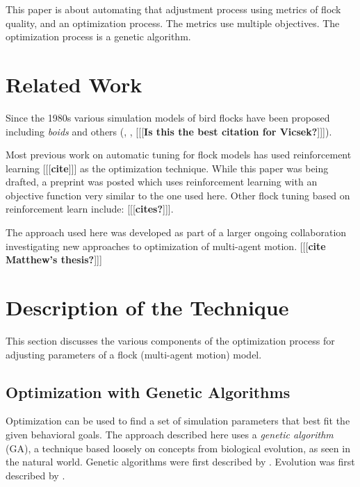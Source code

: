 \documentclass[letterpaper]{article}
\begin{document}
This paper is about automating that adjustment process using metrics of flock quality, and an optimization process. The metrics use multiple objectives. The optimization process is a genetic algorithm.

\section{Related Work}
\label{sec:related}

Since the 1980s various simulation models of bird flocks have been proposed including \textit{boids} \citep{reynolds_flocks_1987} and others (\citet{aoki_simulation_1982}, \citet{cucker_emergent_2007}, \citet{bhattacharya_collective_2010} [[[\textbf{Is this the best citation for Vicsek?}]]]).
\par

Most previous work on automatic tuning for flock models has used reinforcement learning [[[\textbf{cite}]]] as the optimization technique. While this paper was being drafted, a preprint was posted \citep{brambati_learning_2025} which uses reinforcement learning with an objective function very similar to the one used here. Other flock tuning based on reinforcement learn include:
[[[\textbf{cites?}]]].
\par


The approach used here was developed as part of a larger ongoing collaboration investigating new approaches to optimization of multi-agent motion. [[[\textbf{cite Matthew's thesis?}]]]

\section{Description of the Technique}
\label{sec:Description}

This section discusses the various components of the optimization process for adjusting parameters of a flock (multi-agent motion) model.
\par

\subsection{Optimization with Genetic Algorithms}
\label{subsec:Optimization_with_GA}

Optimization can be used to find a set of simulation parameters that best fit the given behavioral goals. The approach described here uses a \textit{genetic algorithm} (GA), a technique based loosely on concepts from biological evolution, as seen in the natural world. Genetic algorithms were first described by \citet{holland_adaptation_1975}. Evolution was first described by \citet{darwin_origin_1859}.
\par
\end{document}
